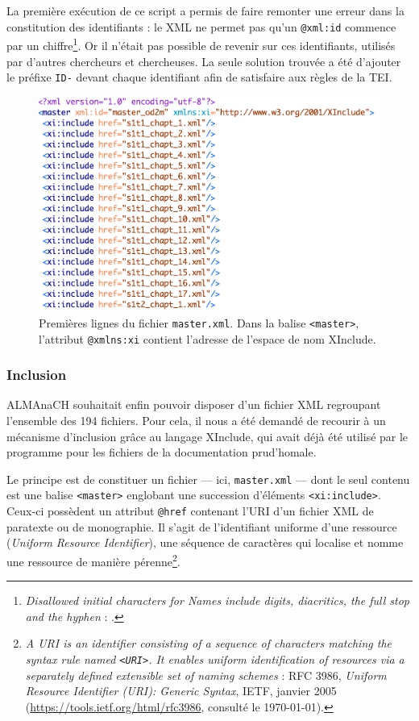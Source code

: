 La première exécution de ce script a permis de faire remonter une erreur dans la constitution des identifiants : le XML ne permet pas qu'un \texttt{@xml:id} commence par un chiffre\footnote{\og \textit{Disallowed initial characters for Names include digits, diacritics, the full stop and the hyphen} \fg{}: \cite{xmlid}.}. Or il n'était pas possible de revenir sur ces identifiants, utilisés par d'autres chercheurs et chercheuses. La seule solution trouvée a été d'ajouter le préfixe \texttt{ID-} devant chaque identifiant afin de satisfaire aux règles de la TEI.

\begin{figure}
    \centering
    \includegraphics[width=15cm]{img/xinclude.png}
    \caption[Premières lignes du fichier \texttt{master.xml}]{Premières lignes du fichier \texttt{master.xml}. Dans la balise \texttt{<master>}, l'attribut \texttt{@xmlns:xi} contient l'adresse de l'espace de nom XInclude.}
    \label{fig:xinclude}
\end{figure}

\subsubsection{Inclusion}

ALMAnaCH souhaitait enfin pouvoir disposer d'un fichier XML regroupant l'ensemble des 194 fichiers. Pour cela, il nous a été demandé de recourir à un mécanisme d'inclusion grâce au langage XInclude, qui avait déjà été utilisé par le programme \timeus{} pour les fichiers de la documentation prud'homale.

Le principe est de constituer un fichier --- ici, \texttt{master.xml} --- dont le seul contenu est une balise \texttt{<master>} englobant une succession d'éléments \texttt{<xi:include>}. Ceux-ci possèdent un attribut \texttt{@href} contenant l'URI d'un fichier XML de paratexte ou de monographie. Il s'agit de l'identifiant uniforme d'une ressource (\textit{Uniform Resource Identifier}), \cad{} une séquence de caractères qui localise et nomme une ressource de manière pérenne\footnote{\og \textit{A URI is an identifier consisting of a sequence of characters matching the syntax rule named \texttt{<URI>}. It enables uniform identification of resources via a separately defined extensible set of naming schemes} \fg{} : RFC 3986, \textit{Uniform Resource Identifier (URI): Generic Syntax}, IETF, janvier 2005 (\url{https://tools.ietf.org/html/rfc3986}, consulté le \today).}.

